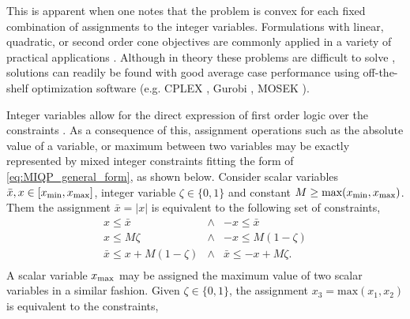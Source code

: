 \documentclass[twocolumn,letterpaper]{IEEEAerospaceCLS}  %
\theoremstyle{definition}
\begin{document}
This is apparent when one notes that the problem is convex for each fixed combination of assignments to the integer variables. 
Formulations with linear, quadratic, or second order cone objectives are commonly applied in a variety of practical applications \cite{richards2002spacecraft,mellinger2012mixed,lorenzetti2018reach,levalley2019mixed,mote2020collision,mote2017robotic}. 
Although in theory these problems are difficult to solve \cite{del2017mixed}, solutions can readily be found with good average case performance using off-the-shelf optimization software (e.g. CPLEX \cite{cplex2009v12}, Gurobi \cite{optimization2014inc}, MOSEK \cite{mosek2010mosek}). 


Integer variables allow for the direct expression of first order logic over the constraints \cite{hillier2004mp,bemporad1999control}.
As a consequence of this, assignment operations such as the absolute value of a variable, or maximum between two variables may be exactly represented by mixed integer constraints fitting the form of \eqref{eq:MIQP_general_form}, as shown below. 
Consider scalar variables $\bar{x},x \in [x_{\rm min}, x_{\rm max}]$, integer variable $\zeta \in \{0,1\}$ and constant $M \geq \text{max}(x_{\rm min}, x_{\rm max})$. Them the assignment $\bar{x} = |x| $ is equivalent to the following set of constraints, 
\begin{equation} \label{eq: constraints for abs operation}
  \begin{array}{ccc}
     x \leq \bar{x} &\wedge& -x \leq \bar{x} \\
     x\leq M \zeta  &\wedge & -x\leq M(1-\zeta) \\ 
     \bar{x} \leq x+M(1-\zeta) &\wedge& \bar{x} \leq -x + M\zeta. \\
  \end{array}
\end{equation}
A scalar variable $x_{\rm max}$ may be assigned the maximum value of two scalar variables in a similar fashion. Given $\zeta\in\{0,1\}$, the assignment $x_{3} = \text{max}({x_1, x_2}) $ is equivalent to the constraints, 
\end{document}
